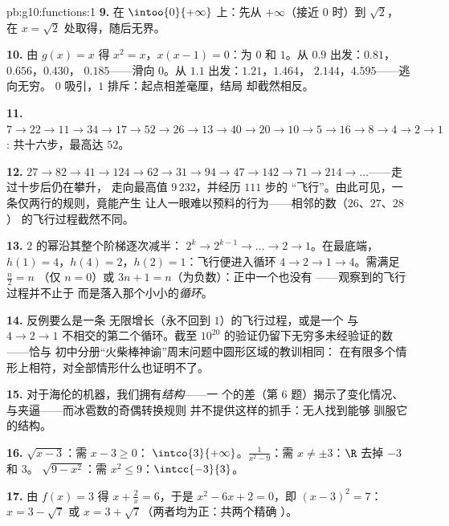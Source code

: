 \begin{solution}{pb:g10:functions:1}
\textbf{9.} 在 $\intoo{0}{+\infty}$ 上：先从
$+\infty$（接近 $0$ 时）到 $\sqrt2$，
在 $x = \sqrt2$ 处取得，随后无界。

\textbf{10.} 由 $g(x) = x$ 得 $x^2 = x$，$x(x - 1) = 0$：为
$0$ 和 $1$。从 $0.9$ 出发：$0.81$，$0.656$，$0.430$，
$0.185$——滑向 $0$。从 $1.1$ 出发：$1.21$，$1.464$，
$2.144$，$4.595$——逃向无穷。 $0$
吸引，$1$ 排斥：起点相差毫厘，结局
却截然相反。

\textbf{11.} $7 \to 22 \to 11 \to 34 \to 17 \to 52 \to 26 \to
13 \to 40 \to 20 \to 10 \to 5 \to 16 \to 8 \to 4 \to 2 \to 1$:
共十六步，最高达 $52$。

\textbf{12.} $27 \to 82 \to 41 \to 124 \to 62 \to 31 \to 94 \to
47 \to 142 \to 71 \to 214 \to \dots$——走过十步后仍在攀升，
走向最高值 $9\,232$，并经历 $111$ 步的
“飞行”。由此可见，一条仅两行的规则，竟能产生
让人一眼难以预料的行为——相邻的数（$26$、$27$、$28$）
的飞行过程截然不同。

\textbf{13.} $2$ 的幂沿其整个阶梯逐次减半：
$2^k \to 2^{k-1} \to \dots \to 2 \to 1$。在最底端，
$h(1) = 4$，$h(4) = 2$，$h(2) = 1$：飞行便进入循环
$4 \to 2 \to 1 \to 4$。需满足 $\frac n2 = n$
（仅 $n = 0$）或 $3n + 1 = n$（为负数）：正中一个也没有
——观察到的飞行过程并不止于
而是落入那个小小的\emph{循环}。

\textbf{14.} 反例要么是一条
无限增长（永不回到 $1$）的飞行过程，或是一个
与 $4 \to 2 \to 1$ 不相交的第二个循环。截至
$10^{20}$ 的验证仍留下无穷多未经验证的数——恰与
初中分册“火柴棒神谕”周末问题中圆形区域的教训相同：
在有限多个情形上相符，对全部情形什么也证明不了。

\textbf{15.} 对于海伦的机器，我们拥有\emph{结构}——一
个的差（第 6 题）揭示了变化情况、
与夹逼——而冰雹数的奇偶转换规则
并不提供这样的抓手：无人找到能够
驯服它的结构。

\textbf{16.} $\sqrt{x - 3}$：需 $x - 3 \geq 0$：
$\intco{3}{+\infty}$。$\frac{1}{x^2 - 9}$：需
$x \neq \pm 3$：$\R$ 去掉 $-3$ 和 $3$。
$\sqrt{9 - x^2}$：需 $x^2 \leq 9$：$\intcc{-3}{3}$。

\textbf{17.} 由 $f(x) = 3$ 得 $x + \frac2x = 6$，于是
$x^2 - 6x + 2 = 0$，即 $(x - 3)^2 = 7$：
$x = 3 - \sqrt7$ 或 $x = 3 + \sqrt7$（两者均为正：共两个精确
）。


\end{solution}
